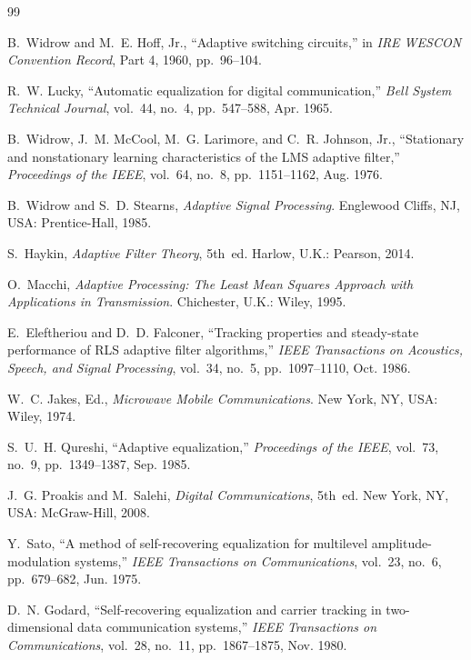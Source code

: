 {\small
\begin{thebibliography}{99}

 B.~Widrow and M.~E. Hoff, Jr., ``Adaptive switching circuits,'' in \emph{IRE WESCON Convention Record}, Part 4, 1960, pp.~96--104.

 R.~W. Lucky, ``Automatic equalization for digital communication,'' \emph{Bell System Technical Journal}, vol.~44, no.~4, pp.~547--588, Apr. 1965.

 B.~Widrow, J.~M. McCool, M.~G. Larimore, and C.~R. Johnson, Jr., ``Stationary and nonstationary learning characteristics of the LMS adaptive filter,'' \emph{Proceedings of the IEEE}, vol.~64, no.~8, pp.~1151--1162, Aug. 1976.

 B.~Widrow and S.~D. Stearns, \emph{Adaptive Signal Processing}. Englewood Cliffs, NJ, USA: Prentice-Hall, 1985.

 S.~Haykin, \emph{Adaptive Filter Theory}, 5th~ed. Harlow, U.K.: Pearson, 2014.

 O.~Macchi, \emph{Adaptive Processing: The Least Mean Squares Approach with Applications in Transmission}. Chichester, U.K.: Wiley, 1995.

 E.~Eleftheriou and D.~D. Falconer, ``Tracking properties and steady-state performance of RLS adaptive filter algorithms,'' \emph{IEEE Transactions on Acoustics, Speech, and Signal Processing}, vol.~34, no.~5, pp.~1097--1110, Oct. 1986.

 W.~C. Jakes, Ed., \emph{Microwave Mobile Communications}. New York, NY, USA: Wiley, 1974.

 S.~U.~H. Qureshi, ``Adaptive equalization,'' \emph{Proceedings of the IEEE}, vol.~73, no.~9, pp.~1349--1387, Sep. 1985.

 J.~G. Proakis and M.~Salehi, \emph{Digital Communications}, 5th~ed. New York, NY, USA: McGraw-Hill, 2008.

 Y.~Sato, ``A method of self-recovering equalization for multilevel amplitude-modulation systems,'' \emph{IEEE Transactions on Communications}, vol.~23, no.~6, pp.~679--682, Jun. 1975.

 D.~N. Godard, ``Self-recovering equalization and carrier tracking in two-dimensional data communication systems,'' \emph{IEEE Transactions on Communications}, vol.~28, no.~11, pp.~1867--1875, Nov. 1980.


\end{thebibliography}}
